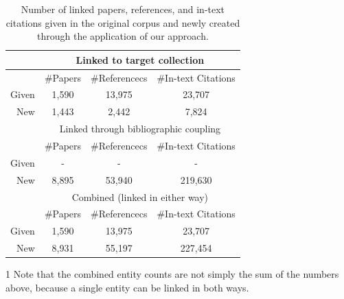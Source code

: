 \begin{table}
   \centering
   \caption{Number of linked papers, references, and in-text citations given in the original corpus and newly created through the application of our approach.}
   \label{tab:newlinks}
   \begin{small}
   \begin{threeparttable}
   \begin{tabular}{rccc}
     \toprule
     \ & \multicolumn{3}{c}{Linked to target collection} \\
     \midrule
     \ & \#Papers & \#Referencecs & \#In-text Citations \\
     Given & 1,590 & 13,975 & 23,707 \\
     New & 1,443 & 2,442 & 7,824 \\
     \midrule
     \ & \multicolumn{3}{c}{Linked through bibliographic coupling} \\
     \midrule
     \ & \#Papers & \#Referencecs & \#In-text Citations \\
     Given & - & - & - \\
     New & 8,895 & 53,940 & 219,630 \\
     \midrule
     \ & \multicolumn{3}{c}{Combined (linked in either way)\tnote{1}} \\
     \midrule
     \ & \#Papers & \#Referencecs & \#In-text Citations \\
     Given & 1,590 & 13,975 & 23,707 \\
     New & 8,931 & 55,197 & 227,454 \\
   \bottomrule
 \end{tabular}
    \begin{footnotesize}
    \begin{tablenotes}
      \item[1] Note that the combined entity counts are not simply the sum of the numbers above, because a single entity can be linked in both ways.
  \end{tablenotes}
   \end{footnotesize}
  \end{threeparttable}
  \end{small}
\end{table}

